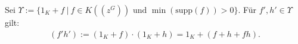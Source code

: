 %
%
%
%
%
%
%
 
\begin{defn}
Sei $\Upsilon :=\lbrace 1_K + f~|~ f \in K\left(\left(z^{G}\right)\right) \text{ und } \min(\text{supp}(f)) >0\rbrace$. Für $f', h' \in \Upsilon$ gilt:
\begin{eqnarray*}
 \left(f'h'\right):= \left(1_K + f\right) \cdot \left(1_K + h\right) = 1_K + \left(f+h+fh\right).
\end{eqnarray*} 
\end{defn}
%
%
%
%
%
%

